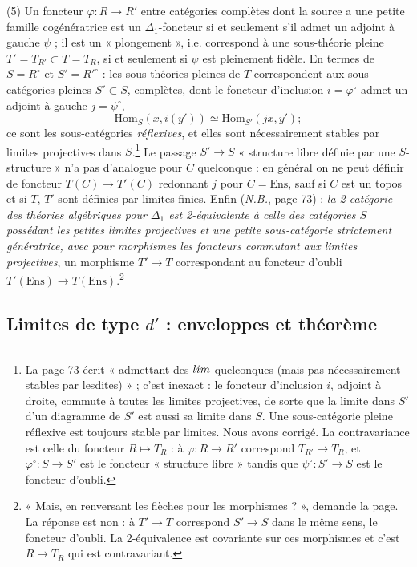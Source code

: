 \documentclass[11pt,a4paper]{article}
\begin{document}
(5) Un foncteur $\varphi : R \to R'$ entre catégories complètes dont la
source a une petite famille cogénératrice est un $\Delta_{1}$-foncteur
si et seulement s'il admet un adjoint à gauche $\psi$ ; il est un
« plongement », i.e. correspond à une sous-théorie pleine $T' = T_{R'}
\subset T = T_{R}$, si et seulement si $\psi$ est pleinement fidèle. En
termes de $S = R^{\circ}$ et $S' = R'^{\circ}$ : les sous-théories pleines
de $T$ correspondent aux sous-catégories pleines $S' \subset S$, complètes,
dont le foncteur d'inclusion $i = \varphi^{\circ}$ admet un adjoint à
gauche $j = \psi^{\circ}$,
\[
\mathrm{Hom}_{S}(x, i(y')) \simeq \mathrm{Hom}_{S'}(jx, y') ;
\]
ce sont les sous-catégories \emph{réflexives}, et elles sont
nécessairement stables par limites projectives dans $S$.\footnote{La page
73 écrit « admettant des $\varprojlim$ quelconques (mais pas
nécessairement stables par lesdites) » ; c'est inexact : le foncteur
d'inclusion $i$, adjoint à droite, commute à toutes les limites
projectives, de sorte que la limite dans $S'$ d'un diagramme de $S'$ est
aussi sa limite dans $S$. Une sous-catégorie pleine réflexive est toujours
stable par limites. Nous avons corrigé. La contravariance est celle du
foncteur $R \mapsto T_{R}$ : à $\varphi : R \to R'$ correspond $T_{R'} \to
T_{R}$, et $\varphi^{\circ} : S \to S'$ est le foncteur « structure libre »
tandis que $\psi^{\circ} : S' \to S$ est le foncteur d'oubli.} Le passage
$S' \to S$ « structure libre définie par une $S$-structure » n'a pas
d'analogue pour $C$ quelconque : en général on ne peut définir de foncteur
$T(C) \to T'(C)$ redonnant $j$ pour $C = \mathrm{Ens}$, sauf si $C$ est un
topos et si $T$, $T'$ sont définies par limites finies. Enfin
(\emph{N.B.}, page 73) : \emph{la 2-catégorie des théories algébriques pour
$\Delta_{1}$ est 2-équivalente à celle des catégories $S$ possédant les
petites limites projectives et une petite sous-catégorie strictement
génératrice, avec pour morphismes les foncteurs commutant aux limites
projectives}, un morphisme $T' \to T$ correspondant au foncteur d'oubli
$T'(\mathrm{Ens}) \to T(\mathrm{Ens})$.\footnote{« Mais, en renversant les
flèches pour les morphismes ? », demande la page. La réponse est non : à $T' \to T$
correspond $S' \to S$ dans le même sens, le foncteur d'oubli. La
2-équivalence est covariante sur ces morphismes et c'est
$R \mapsto T_{R}$ qui est contravariant.}

\subsection*{Limites de type $d'$ : enveloppes et théorème}
\end{document}
